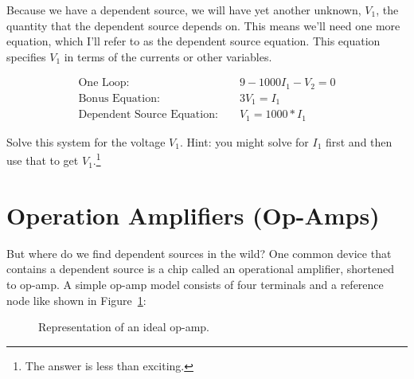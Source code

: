 Because we have a dependent source, we will have yet another unknown, $V_1$, the quantity that the dependent source depends on. This means we'll need one more equation, which I'll refer to as the dependent source equation. This equation specifies $V_1$ in terms of the currents or other variables.\par

\begin{align*}
\text{One Loop: }&&9-1000I_1-V_2=0\\
\text{Bonus Equation: }&&3V_1=I_1 \\
\text{Dependent Source Equation: }&&V_1=1000*I_1
\end{align*}

\begin{clevel}
Solve this system for the voltage $V_1$. Hint: you might solve for $I_1$ first and then use that to get $V_1$.\footnote{The answer is less than exciting.}
\end{clevel}

\section{Operation Amplifiers (Op-Amps)}
But where do we find dependent sources in the wild? One common device that contains a dependent source is a chip called an operational amplifier, shortened to op-amp. A simple op-amp model consists of four terminals and a reference node like shown in Figure~\ref{5:OAM}:

\begin{figure}[H]
\begin{center}
\caption{Representation of an ideal op-amp.}
\label{5:OAM}
\end{center}
\end{figure}

